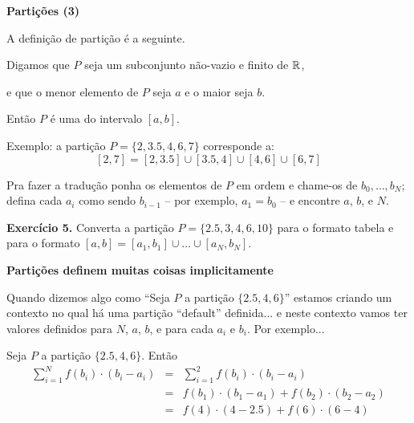\documentclass[oneside,12pt]{article}
\begin{document}
{\bf Partições (3)}

A definição  de partição é a seguinte.

Digamos que $P$ seja um subconjunto não-vazio e finito de $\mathbb{R}$,

e que o menor elemento de $P$ seja $a$ e o maior seja $b$.

Então $P$ é uma  do intervalo $[a,b]$.

\msk

Exemplo: a partição $P=\{2,3.5,4,6,7\}$ corresponde a:
%
$$[2,7] = [2,3.5]∪[3.5,4]∪[4,6]∪[6,7]$$

Pra fazer a tradução ponha os elementos de $P$ em ordem e chame-os de
$b_0,\ldots,b_N$; defina cada $a_i$ como sendo $b_{i-1}$ -- por
exemplo, $a_1 = b_0$ -- e encontre $a$, $b$, e $N$.

\msk

{\bf Exercício 5.} Converta a partição $P=\{2.5,3,4,6,10\}$ para o
formato tabela e para o formato $[a,b] = [a_1,b_1]∪\ldots∪[a_N,b_N].$



\newpage


{\bf Partições definem muitas coisas implicitamente}

Quando dizemos algo como ``Seja $P$ a partição $\{2.5,4,6\}$'' estamos
criando um contexto no qual há uma partição ``default'' definida... e
neste contexto vamos ter valores definidos para $N$, $a$, $b$, e para
cada $a_i$ e $b_i$. Por exemplo...

\msk

Seja $P$ a partição $\{2.5,4,6\}$. Então
%
$$\begin{array}{rcl}
  \sum_{i=1}^N f(b_i)·(b_i-a_i)
     &=& \sum_{i=1}^2 f(b_i)·(b_i-a_i) \\
     &=& f(b_1)·(b_1-a_1) + f(b_2)·(b_2-a_2) \\
     &=& f(4)·(4-2.5) + f(6)·(6-4) \\
  \end{array}
$$
\end{document}
